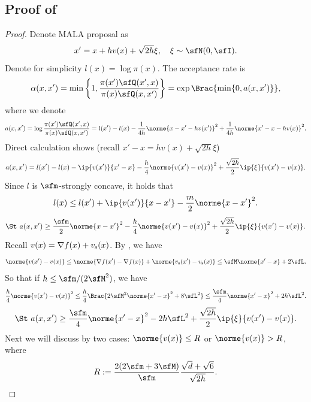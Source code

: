 \documentclass[11pt]{article}
\begin{document}
\subsection{Proof of \texorpdfstring{}{Lemma \ref{lem:ac_MALA}}}
\label{app:pf_ac_MALA}


\begin{proof}
%
Denote MALA proposal as
\[
    x' = x + h v(x) + \sqrt{2h} \xi, \quad \xi \sim \sfN(0,\sfI).
\]
Denote for simplicity $l(x) = \log \pi(x)$.
The acceptance rate is 
\[
    \alpha(x,x') = \min \left\{ 1, \frac{ \pi(x') \sfQ(x',x) }{ \pi(x) \sfQ(x,x') } \right\} = \exp \Brac{ \min \{ 0, a(x,x') \} }, 
\]
where we denote 
\[
    a(x,x') = \log \frac{ \pi(x') \sfQ(x',x) }{ \pi(x) \sfQ(x,x') } = l(x') - l(x) - \frac{1}{4h} \norme{ x - x' - h v(x') }^2 + \frac{1}{4h} \norme{ x' - x - h v(x) }^2. 
\]
%
Direct calculation shows (recall $x' - x = h v(x) + \sqrt{2h} \xi$)
\[
    a(x,x') = l(x') - l(x) - \ip{ v(x') }{x'-x} - \frac{h}{4} \norme{ v(x') - v(x) }^2 + \frac{\sqrt{2h} }{2} \ip{ \xi }{v(x')-v(x)}. 
\]
Since $l$ is $\sfm$-strongly concave, it holds that
\[
    l(x) \le l(x') + \ip{v(x')}{x-x'} - \frac{m}{2} \norme{ x - x' }^2. 
\]
\[
    \St~ a(x,x') \ge \frac{\sfm}{2} \norme{ x - x' }^2 - \frac{h}{4} \norme{ v(x') - v(x) }^2 + \frac{\sqrt{2h}}{2} \ip{ \xi }{v(x')-v(x)}.   
\]
%
Recall $v(x) = \nabla f(x) + v_{\rm s}(x)$. By , we have
\begin{equation}
\label{eqn:pf_v_lipbound}
    \norme{v(x')-v(x)} \le \norme{ \nabla f(x') - \nabla f(x) } + \norme{v_{\rm s}(x')-v_{\rm s}(x)} \le \sfM \norme{x'-x} + 2 \sfL.
\end{equation}
So that if $h \le \sfm/(2\sfM^2)$, we have 
\[
    \frac{h}{4} \norme{ v(x') - v(x) }^2 \le \frac{h}{4} \Brac{ 2 \sfM^2 \norme{x'-x}^2 + 8 \sfL^2 } \le \frac{\sfm}{4} \norme{x'-x}^2 + 2 h \sfL^2.
\]
\begin{equation}
\label{eqn:pf_a_lowerbound}
    \St~ a(x,x') \ge \frac{\sfm}{4} \norme{x'-x}^2 - 2 h \sfL^2 + \frac{\sqrt{2h}}{2} \ip{ \xi }{v(x')-v(x)}. 
\end{equation}
%
Next we will discuss by two cases: $\norme{v(x)} \le R$ or $\norme{v(x)}> R$, where
\begin{equation}
\label{eqn:pf_R_def}
    R := \frac{2(2\sfm+3\sfM)}{\sfm} \frac{\sqrt{d}+\sqrt{6}}{\sqrt{2h}}.
\end{equation}
    



\end{proof}
\end{document}
